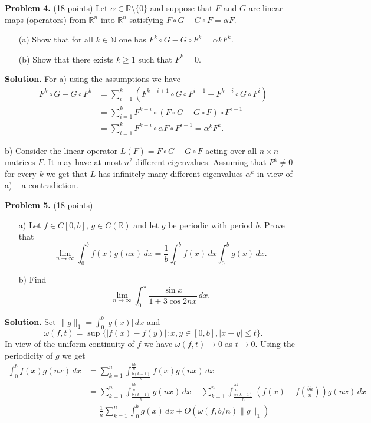 \documentclass{article}
\begin{document}
\textbf{Problem 4.} (18 points) Let $\alpha \in \mathbb{R} \setminus \{0\}$ and suppose that $F$ and $G$ are linear maps (operators) from $\mathbb{R}^n$ into $\mathbb{R}^n$ satisfying $F \circ G - G \circ F = \alpha F$.
\begin{enumerate}
    \item[(a)] Show that for all $k \in \mathbb{N}$ one has $F^k \circ G - G \circ F^k = \alpha k F^k$.
    \item[(b)] Show that there exists $k \geq 1$ such that $F^k = 0$.
\end{enumerate}

\textbf{Solution.} For a) using the assumptions we have
\begin{align*}
F^k \circ G - G \circ F^k &= \sum_{i=1}^{k} \left( F^{k-i+1} \circ G \circ F^{i-1} - F^{k-i} \circ G \circ F^i \right) \\
&= \sum_{i=1}^{k} F^{k-i} \circ (F \circ G - G \circ F) \circ F^{i-1} \\
&= \sum_{i=1}^{k} F^{k-i} \circ \alpha F \circ F^{i-1} = \alpha^k F^k.
\end{align*}

b) Consider the linear operator $L(F) = F \circ G - G \circ F$ acting over all $n \times n$ matrices $F$. It may have at most $n^2$ different eigenvalues. Assuming that $F^k \neq 0$ for every $k$ we get that $L$ has infinitely many different eigenvalues $\alpha^k$ in view of a) -- a contradiction.

\textbf{Problem 5.} (18 points)
\begin{enumerate}
    \item[a)] Let $f \in C[0, b]$, $g \in C(\mathbb{R})$ and let $g$ be periodic with period $b$. Prove that
    \[
    \lim_{n \to \infty} \int_{0}^{b} f(x)g(nx) \, dx = \frac{1}{b} \int_{0}^{b} f(x) \, dx \int_{0}^{b} g(x) \, dx.
    \]

    \item[b)] Find
    \[
    \lim_{n \to \infty} \int_{0}^{\pi} \frac{\sin x}{1 + 3\cos 2nx} \, dx.
    \]
\end{enumerate}

\textbf{Solution.} Set $\|g\|_1 = \int_{0}^{b} |g(x)| \, dx$ and
\[
\omega(f, t) = \sup \{|f(x) - f(y)| : x, y \in [0, b], |x - y| \leq t\}.
\]
In view of the uniform continuity of $f$ we have $\omega(f, t) \to 0$ as $t \to 0$. Using the periodicity of $g$ we get
\begin{align*}
\int_{0}^{b} f(x)g(nx) \, dx &= \sum_{k=1}^{n} \int_{\frac{b(k-1)}{n}}^{\frac{bk}{n}} f(x)g(nx) \, dx \\
&= \sum_{k=1}^{n} \int_{\frac{b(k-1)}{n}}^{\frac{bk}{n}} g(nx) \, dx + \sum_{k=1}^{n} \int_{\frac{b(k-1)}{n}}^{\frac{bk}{n}} \left( f(x) - f\left(\frac{bk}{n}\right) \right) g(nx) \, dx \\
&= \frac{1}{n} \sum_{k=1}^{n} \int_{0}^{b} g(x) \, dx + O(\omega(f, b/n)\|g\|_1)
\end{align*}
\end{document}
